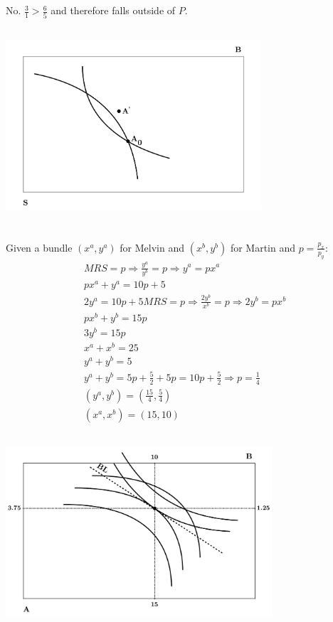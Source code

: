 \documentclass{article}
\begin{document}
	\subsection[d]{}
		No. $\frac{3}{1} > \frac{6}{5}$ and therefore falls outside of $P$. 
	\subsection[e]{}
		\includegraphics[height=2.5in]{Charts/3e}
\section[4]{}
	\subsection[a]{}
		Given a bundle $(x^a,y^a)$ for Melvin and $(x^b,y^b)$ for Martin and $p = \frac{p_x}{p_y}$:
		\begin{align}
			MRS = p \Rightarrow \frac{y^a}{y^b} = p \Rightarrow y^a = px^a\\
			px^a +y^a = 10p+5\\
			2y^a = 10p+5
			MRS = p \Rightarrow \frac{2y^b}{x^b}=p \Rightarrow 2y^b = px^b\\
			px^b + y^b = 15 p\\
			3y^b =15p\\
			x^a+x^b = 25\\
			y^a+y^b = 5 \\
			y^a+y^b=5p+\frac{5}{2} + 5p = 10p+\frac{5}{2} \Rightarrow p = \frac{1}{4}\\
			(y^a, y^b) = \left ( \frac{15}{4}, \frac{5}{4}  \right )\\	
			(x^a, x^b) = (15,10)	
		\end{align}
	\subsection[b]{}
		\includegraphics[height=2.5in]{Charts/4b}
\end{document}
